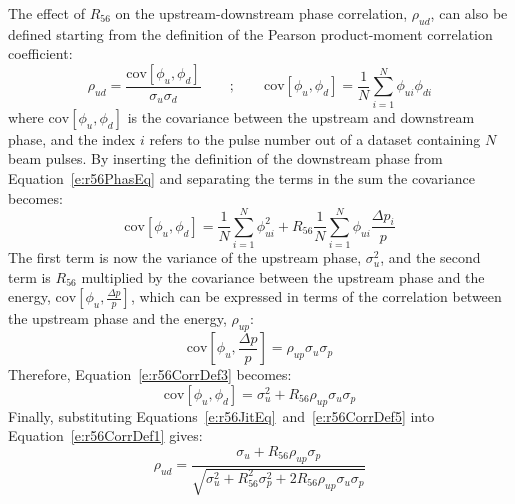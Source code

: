 The effect of \(R_{56}\) on the upstream-downstream phase correlation, \(\rho_{ud}\), can also be defined starting from the definition of the Pearson product-moment correlation coefficient:
\begin{equation}
\rho_{ud} = \frac{\mathrm{cov}\left[\phi_u,\phi_d\right]}{\sigma_u\sigma_d}
\qquad\mathrm{;}\qquad
\mathrm{cov}\left[\phi_u,\phi_d\right] = \frac{1}{N} \sum_{i=1}^{N}\phi_{ui}\phi_{di}
\label{e:r56CorrDef1}
\end{equation}
where \(\mathrm{cov}\left[\phi_u,\phi_d\right]\) is the covariance between the upstream and downstream phase, and the index \(i\) refers to the pulse number out of a dataset containing \(N\) beam pulses.
By inserting the definition of the downstream phase from Equation~\ref{e:r56PhasEq} and separating the terms in the sum the covariance becomes:
\begin{equation}
\mathrm{cov}\left[\phi_u,\phi_d\right] = \frac{1}{N} \sum_{i=1}^{N}\phi_{ui}^{2} + R_{56}\frac{1}{N} \sum_{i=1}^{N}\phi_{ui}\frac{\Delta p_i}{p}
\label{e:r56CorrDef3}
\end{equation}
The first term is now the variance of the upstream phase, \(\sigma_u^2\), and the second term is \(R_{56}\) multiplied by the covariance between the upstream phase and the energy, \(\mathrm{cov}\left[\phi_u,\frac{\Delta p}{p}\right]\), which can be expressed in terms of the correlation between the upstream phase and the energy, \(\rho_{up}\):
\begin{equation}
\mathrm{cov}\left[\phi_u,\frac{\Delta p}{p}\right] = \rho_{up}\sigma_u\sigma_{p}
\label{e:r56CorrDef4}
\end{equation}
Therefore, Equation~\ref{e:r56CorrDef3} becomes:
\begin{equation}
\mathrm{cov}\left[\phi_u,\phi_d\right] = \sigma_u^2 + R_{56}\rho_{up}\sigma_u\sigma_p
\label{e:r56CorrDef5}
\end{equation}
Finally, substituting Equations~\ref{e:r56JitEq}~and~\ref{e:r56CorrDef5} into Equation~\ref{e:r56CorrDef1} gives:
\begin{equation}
\rho_{ud} = \frac{\sigma_u + R_{56}\rho_{up}\sigma_p}{\sqrt{\sigma_u^2 + R_{56}^2\sigma_{p}^2 + 2R_{56}\rho_{up}\sigma_{u}\sigma_{p}}}
\label{e:r56CorrDefFinal}
\end{equation}


